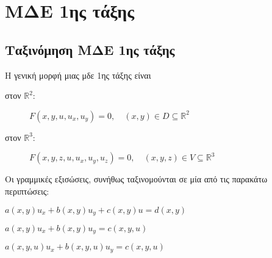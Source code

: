 



\everymath{\displaystyle}
\thispagestyle{askhseis}




\chapter{ΜΔΕ 1ης τάξης}

\section{Ταξινόμηση ΜΔΕ 1ης τάξης}

Η γενική μορφή μιας μδε 1ης τάξης είναι 
\begin{description}
  \item [στον $\mathbb{R}^{2}$:] $ F(x,y,u,u_{x},u_{y}) = 0, \quad (x,y) \in D 
    \subseteq \mathbb{R}^{2} $  \\
  \item [στον $\mathbb{R}^{3}:$] $ F(x,y,z,u,u_{x},u_{y},u_{z}) = 0, \quad (x,y,z) \in V 
    \subseteq \mathbb{R}^{3} $ \\
\end{description} 

Οι γραμμικές εξισώσεις, συνήθως ταξινομούνται σε μία από τις παρακάτω περιπτώσεις:
\begin{description}[widest=Σχεδον Γραμμικες:,labelindent=1em,labelsep*=1em,itemindent=0pt,leftmargin=*]
  \item [Γραμμικές:] $ a(x,y)u_{x}+b(x,y)u_{y}+c(x,y)u=d(x,y) $
  \item [Σχεδόν Γραμμικές:] $ a(x,y)u_{x}+b(x,y)u_{y}=c(x,y,u) $
  \item [Ημιγραμμικές:] $ a(x,y,u)u_{x}+b(x,y,u)u_{y}=c(x,y,u) $
\end{description}

